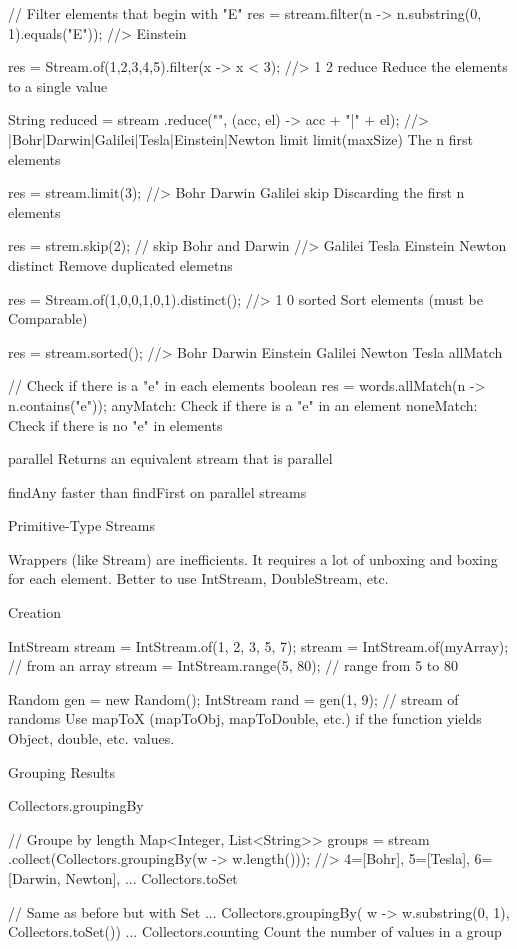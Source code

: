 // Filter elements that begin with "E"
res = stream.filter(n -> n.substring(0, 1).equals("E"));
//> Einstein

res = Stream.of(1,2,3,4,5).filter(x -> x < 3);
//> 1 2
reduce
Reduce the elements to a single value

String reduced = stream
	.reduce("", (acc, el) -> acc + "|" + el);
//> |Bohr|Darwin|Galilei|Tesla|Einstein|Newton
limit limit(maxSize) The n first elements

res = stream.limit(3);
//> Bohr Darwin Galilei
skip Discarding the first n elements

res = strem.skip(2); // skip Bohr and Darwin
//> Galilei Tesla Einstein Newton
distinct Remove duplicated elemetns

res = Stream.of(1,0,0,1,0,1).distinct();
//> 1 0
sorted Sort elements (must be Comparable)

res = stream.sorted();
//> Bohr Darwin Einstein Galilei Newton Tesla
allMatch

// Check if there is a "e" in each elements
boolean res = words.allMatch(n -> n.contains("e"));
anyMatch: Check if there is a "e" in an element
noneMatch: Check if there is no "e" in elements

parallel Returns an equivalent stream that is parallel

findAny faster than findFirst on parallel streams

Primitive-Type Streams

Wrappers (like Stream) are inefficients. It requires a lot of unboxing and boxing for each element. Better to use IntStream, DoubleStream, etc.

Creation

IntStream stream = IntStream.of(1, 2, 3, 5, 7);
stream = IntStream.of(myArray); // from an array
stream = IntStream.range(5, 80); // range from 5 to 80

Random gen = new Random();
IntStream rand = gen(1, 9); // stream of randoms
Use mapToX (mapToObj, mapToDouble, etc.) if the function yields Object, double, etc. values.

Grouping Results

Collectors.groupingBy

// Groupe by length
Map<Integer, List<String>> groups = stream
	.collect(Collectors.groupingBy(w -> w.length()));
//> 4=[Bohr], 5=[Tesla], 6=[Darwin, Newton], ...
Collectors.toSet

// Same as before but with Set
... Collectors.groupingBy(
	w -> w.substring(0, 1), Collectors.toSet()) ...
Collectors.counting Count the number of values in a group

